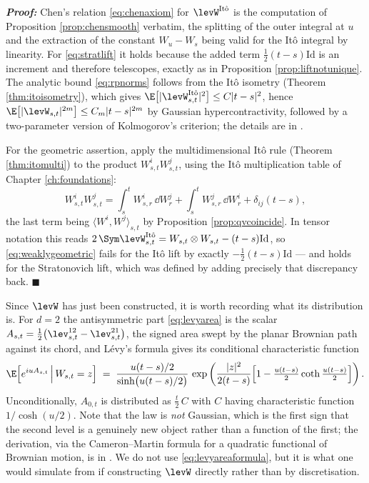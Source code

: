 \textbf{\textit{Proof:}} Chen's relation \eqref{eq:chenaxiom} for $\levW^{\mathrm{It\hat o}}$ is the
computation of Proposition \ref{prop:chensmooth} verbatim, the splitting of the outer integral at
$u$ and the extraction of the constant $W_u - W_s$ being valid for the Itô integral by linearity.
For \eqref{eq:stratlift} it holds because the added term $\tfrac12(t-s)\mathrm{Id}$ is an increment
and therefore telescopes, exactly as in Proposition \ref{prop:liftnotunique}. The analytic bound
\eqref{eq:rpnorms} follows from the Itô isometry (Theorem \ref{thm:itoisometry}), which gives
$\E\bigl[|\levW^{\mathrm{It\hat o}}_{s,t}|^2\bigr] \leq C|t-s|^2$, hence
$\E\bigl[|\levW_{s,t}|^{2m}\bigr] \leq C_m |t-s|^{2m}$ by Gaussian hypercontractivity, followed by a
two-parameter version of Kolmogorov's criterion; the details are in \cite[Ch.\ 3]{frizhairer2020}.

For the geometric assertion, apply the multidimensional Itô rule (Theorem \ref{thm:itomulti}) to the
product $W^i_{s,t}W^j_{s,t}$, using the Itô multiplication table of Chapter \ref{ch:foundations}:
\[
W^i_{s,t}W^j_{s,t} = \int_s^t W^i_{s,r}\,\dd W^j_r + \int_s^t W^j_{s,r}\,\dd W^i_r + \delta_{ij}(t-s),
\]
the last term being $\langle W^i, W^j\rangle_{s,t}$ by Proposition \ref{prop:qvcoincide}. In tensor
notation this reads $2\,\Sym\levW^{\mathrm{It\hat o}}_{s,t} = W_{s,t}\otimes W_{s,t} - (t-s)\mathrm{Id}$,
so \eqref{eq:weaklygeometric} fails for the Itô lift by exactly $-\tfrac12(t-s)\mathrm{Id}$ --- and
holds for the Stratonovich lift, which was defined by adding precisely that discrepancy back.
\hfill $\blacksquare$

\medskip

\begin{remark}\label{rem:levyarealaw}
Since $\levW$ has just been constructed, it is worth recording what its distribution is. For $d=2$
the antisymmetric part \eqref{eq:levyarea} is the scalar
$A_{s,t} = \tfrac12\bigl(\lev^{12}_{s,t}-\lev^{21}_{s,t}\bigr)$, the signed area swept by the planar
Brownian path against its chord, and Lévy's formula gives its conditional characteristic function
\begin{equation}\label{eq:levyareaformula}
\E\Bigl[e^{iuA_{s,t}} \,\Big|\, W_{s,t} = z\Bigr]
\;=\; \frac{u(t-s)/2}{\sinh\bigl(u(t-s)/2\bigr)}\,
\exp\left( \frac{|z|^2}{2(t-s)}\Bigl[1 - \tfrac{u(t-s)}{2}\coth\tfrac{u(t-s)}{2}\Bigr]\right).
\end{equation}
Unconditionally, $A_{0,t}$ is distributed as $\tfrac{t}{2}\,C$ with $C$ having characteristic
function $1/\cosh(u/2)$. Note that the law is \emph{not} Gaussian, which is the first sign that the
second level is a genuinely new object rather than a function of the first; the derivation, via the
Cameron--Martin formula for a quadratic functional of Brownian motion, is in
\cite[Ch.\ 13]{frizvictoir2010}. We do not use \eqref{eq:levyareaformula}, but it is what one would
simulate from if constructing $\levW$ directly rather than by discretisation.
\end{remark}

